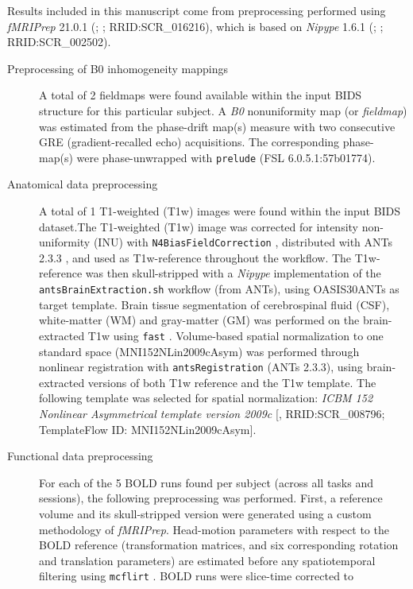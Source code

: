 \documentclass[
]{article}
\author{}
\date{}
\begin{document}
Results included in this manuscript come from preprocessing performed
using \emph{fMRIPrep} 21.0.1 (\citet{fmriprep1}; \citet{fmriprep2};
RRID:SCR\_016216), which is based on \emph{Nipype} 1.6.1
(\citet{nipype1}; \citet{nipype2}; RRID:SCR\_002502).

\begin{description}
\item[Preprocessing of B0 inhomogeneity mappings]
A total of 2 fieldmaps were found available within the input BIDS
structure for this particular subject. A \emph{B0} nonuniformity map (or
\emph{fieldmap}) was estimated from the phase-drift map(s) measure with
two consecutive GRE (gradient-recalled echo) acquisitions. The
corresponding phase-map(s) were phase-unwrapped with \texttt{prelude}
(FSL 6.0.5.1:57b01774).
\item[Anatomical data preprocessing]
A total of 1 T1-weighted (T1w) images were found within the input BIDS
dataset.The T1-weighted (T1w) image was corrected for intensity
non-uniformity (INU) with \texttt{N4BiasFieldCorrection} \citep{n4},
distributed with ANTs 2.3.3 \citep[RRID:SCR\_004757]{ants}, and used as
T1w-reference throughout the workflow. The T1w-reference was then
skull-stripped with a \emph{Nipype} implementation of the
\texttt{antsBrainExtraction.sh} workflow (from ANTs), using OASIS30ANTs
as target template. Brain tissue segmentation of cerebrospinal fluid
(CSF), white-matter (WM) and gray-matter (GM) was performed on the
brain-extracted T1w using \texttt{fast} \citep[FSL 6.0.5.1:57b01774,
RRID:SCR\_002823,][]{fsl_fast}. Volume-based spatial normalization to
one standard space (MNI152NLin2009cAsym) was performed through nonlinear
registration with \texttt{antsRegistration} (ANTs 2.3.3), using
brain-extracted versions of both T1w reference and the T1w template. The
following template was selected for spatial normalization: \emph{ICBM
152 Nonlinear Asymmetrical template version 2009c}
{[}\citet{mni152nlin2009casym}, RRID:SCR\_008796; TemplateFlow ID:
MNI152NLin2009cAsym{]}.
\item[Functional data preprocessing]
For each of the 5 BOLD runs found per subject (across all tasks and
sessions), the following preprocessing was performed. First, a reference
volume and its skull-stripped version were generated using a custom
methodology of \emph{fMRIPrep}. Head-motion parameters with respect to
the BOLD reference (transformation matrices, and six corresponding
rotation and translation parameters) are estimated before any
spatiotemporal filtering using \texttt{mcflirt} \citep[FSL
6.0.5.1:57b01774,][]{mcflirt}. BOLD runs were slice-time corrected to

\end{description}
\end{document}
